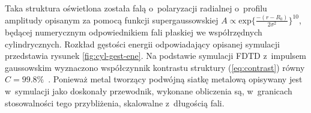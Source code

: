 Taka struktura oświetlona została falą o~polaryzacji radialnej o~profilu amplitudy opisanym za pomocą funkcji supergaussowskiej $A \propto \textrm{exp}\{\frac{-(r-R_0)}{2\sigma^2}\}^{10}$, będącej numerycznym odpowiednikiem fali płaskiej we współrzędnych cylindrycznych. Rozkład gęstości energii odpowiadający opisanej symulacji przedstawia rysunek \ref{fig:cyl-gest-ene}. Na podstawie symulacji FDTD z~impulsem gaussowskim wyznaczono współczynnik kontrastu struktury (\ref{eq:contrast}) równy $C=99.8\%$~\cite{Yavorskiy:14}. Ponieważ metal tworzący podwójną siatkę metalową opisywany jest w~symulacji jako doskonały przewodnik, wykonane obliczenia są, w~granicach stosowalności tego przybliżenia, skalowalne z~długością fali.
